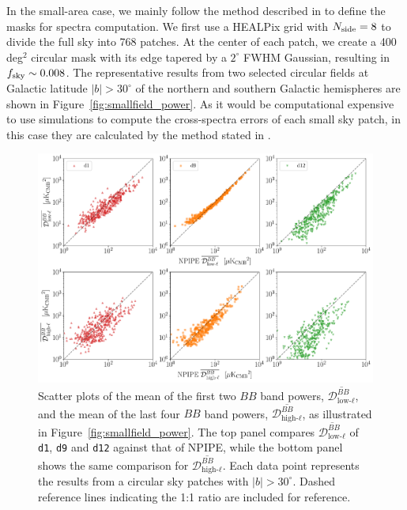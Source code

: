 \documentclass[twocolumn]{aastex631}
\begin{document}
In the small-area case, we mainly follow the method described in \cite{planck2014-XXX} to define the masks for spectra computation. We first use a HEALPix grid with $N_{\rm side} = 8$ to divide the full sky into 768 patches. At the center of each patch, we create a 400\,deg$^2$ circular mask with its edge tapered by a $2^\circ$ FWHM Gaussian, resulting in $f_{\rm sky} \sim 0.008$. The representative results from two selected circular fields at Galactic latitude $|b| > 30^\circ$ of the northern and southern Galactic hemispheres are shown in Figure~\ref{fig:smallfield_power}. As it would be computational expensive to use simulations to compute the cross-spectra errors of each small sky patch, in this case they are calculated by the method stated in \cite{Tristram:2005}. 

\begin{figure}
    \centering
    \includegraphics[width=2.1\columnwidth]{figures/llmean_hlmean_comparison.pdf}
    \caption{Scatter plots of the mean of the first two $BB$ band powers, $\overline{\mathcal{D}_{\text{low-}\ell}^{BB}}$, and the mean of the last four $BB$ band powers, $\overline{\mathcal{D}_{\text{high-}\ell}^{BB}}$, as illustrated in Figure~\ref{fig:smallfield_power}. The top panel compares $\overline{\mathcal{D}_{\text{low-}\ell}^{BB}}$ of \texttt{d1}, \texttt{d9} and \texttt{d12} against that of NPIPE, while the bottom panel shows the same comparison for $\overline{\mathcal{D}_{\text{high-}\ell}^{BB}}$. Each data point represents the results from a circular sky patches with $|b| > 30^\circ$. Dashed reference lines indicating the 1:1 ratio are included for reference.}
    \label{fig:smallfield_power_all}
\end{figure}
\end{document}
